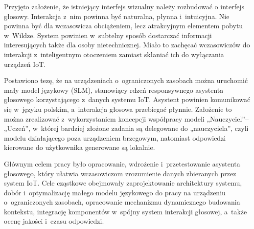 Przyjęto założenie, że istniejący interfejs wizualny należy rozbudować o interfejs głosowy. Interakcja z~nim powinna być naturalna, płynna i~intuicyjna. Nie powinna być dla wczasowicza obciążeniem, lecz atrakcyjnym elementem pobytu w~Wildze. System powinien w~subtelny sposób dostarczać informacji interesujących także dla osoby nietechnicznej. Miało to zachęcać wczasowiczów do interakcji z~inteligentnym otoczeniem zamiast skłaniać ich do wyłączania urządzeń IoT.

Postawiono tezę, że na urządzeniach o~ograniczonych zasobach można uruchomić mały model językowy (SLM), stanowiący rdzeń responsywnego asystenta głosowego korzystającego z~danych systemu IoT. Asystent powinien komunikować się w~języku polskim, a~interakcja głosowa przebiegać płynnie. Założenie to można zrealizować z~wykorzystaniem koncepcji współpracy modeli „Nauczyciel”–„Uczeń”, w~której bardziej złożone zadania są delegowane do „nauczyciela”, czyli modelu działającego poza urządzeniem brzegowym, natomiast odpowiedzi kierowane do użytkownika generowane są lokalnie.

Głównym celem pracy było opracowanie, wdrożenie i~przetestowanie asystenta głosowego, który ułatwia wczasowiczom zrozumienie danych zbieranych przez system IoT. Cele cząstkowe obejmowały zaprojektowanie architektury systemu, dobór i~optymalizację małego modelu językowego do pracy na urządzeniu o~ograniczonych zasobach, opracowanie mechanizmu dynamicznego budowania kontekstu, integrację komponentów w~spójny system interakcji głosowej, a~także ocenę jakości i~czasu odpowiedzi.

